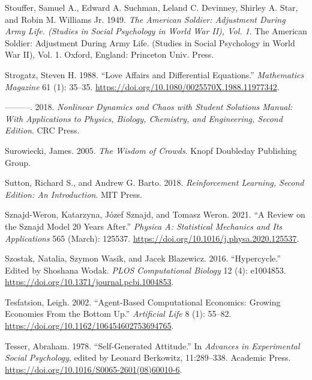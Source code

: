 \documentclass[
  a4paper,
  DIV=11,
  numbers=noendperiod,
  oneside]{scrreprt}
\newlength{\cslhangindent}
\newenvironment{CSLReferences}[2] %
 {\begin{list}{}{%
  \setlength{\itemindent}{0pt}
  \setlength{\leftmargin}{0pt}
  \setlength{\parsep}{0pt}
  \ifodd #1
   \setlength{\leftmargin}{\cslhangindent}
   \setlength{\itemindent}{-1\cslhangindent}
  \fi
  \setlength{\itemsep}{#2\baselineskip}}}
 {\end{list}}
\begin{document}
\begin{CSLReferences}{1}{0}
Stouffer, Samuel A., Edward A. Suchman, Leland C. Devinney, Shirley A.
Star, and Robin M. Williams Jr. 1949. \emph{The {American} Soldier:
{Adjustment} During Army Life. ({Studies} in Social Psychology in {World
War II}), {Vol}. 1}. The {American} Soldier: {Adjustment} During Army
Life. ({Studies} in Social Psychology in {World War II}), {Vol}. 1.
{Oxford, England}: {Princeton Univ. Press}.

Strogatz, Steven H. 1988. {``Love {Affairs} and {Differential
Equations}.''} \emph{Mathematics Magazine} 61 (1): 35--35.
\url{https://doi.org/10.1080/0025570X.1988.11977342}.

---------. 2018. \emph{Nonlinear {Dynamics} and {Chaos} with {Student
Solutions Manual}: {With Applications} to {Physics}, {Biology},
{Chemistry}, and {Engineering}, {Second Edition}}. {CRC Press}.

Surowiecki, James. 2005. \emph{The {Wisdom} of {Crowds}}. {Knopf
Doubleday Publishing Group}.

Sutton, Richard S., and Andrew G. Barto. 2018. \emph{Reinforcement
{Learning}, Second Edition: {An Introduction}}. {MIT Press}.

Sznajd-Weron, Katarzyna, Józef Sznajd, and Tomasz Weron. 2021. {``A
Review on the {Sznajd} Model \textemdash{} 20 Years After.''}
\emph{Physica A: Statistical Mechanics and Its Applications} 565
(March): 125537. \url{https://doi.org/10.1016/j.physa.2020.125537}.

Szostak, Natalia, Szymon Wasik, and Jacek Blazewicz. 2016.
{``Hypercycle.''} Edited by Shoshana Wodak. \emph{PLOS Computational
Biology} 12 (4): e1004853.
\url{https://doi.org/10.1371/journal.pcbi.1004853}.

Tesfatsion, Leigh. 2002. {``Agent-{Based Computational Economics}:
{Growing Economies From} the {Bottom Up}.''} \emph{Artificial Life} 8
(1): 55--82. \url{https://doi.org/10.1162/106454602753694765}.

Tesser, Abraham. 1978. {``Self-{Generated Attitude}.''} In
\emph{Advances in {Experimental Social Psychology}}, edited by Leonard
Berkowitz, 11:289--338. {Academic Press}.
\url{https://doi.org/10.1016/S0065-2601(08)60010-6}.


\end{CSLReferences}
\end{document}
